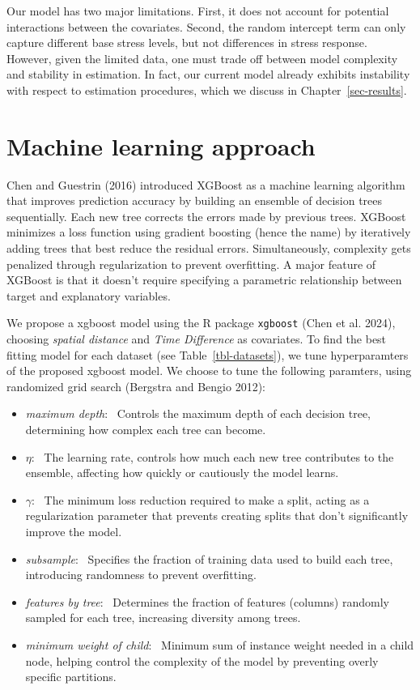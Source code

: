 \documentclass[
  letterpaper,
  DIV=11,
  numbers=noendperiod,
  twocolumn,
  open=any]{scrreprt}
\providecommand{\tightlist}{%
  \setlength{\itemsep}{0pt}\setlength{\parskip}{0pt}}\usepackage{longtable,booktabs,array}
\begin{document}
Our model has two major limitations. First, it does not account for
potential interactions between the covariates. Second, the random
intercept term can only capture different base stress levels, but not
differences in stress response. However, given the limited data, one
must trade off between model complexity and stability in estimation. In
fact, our current model already exhibits instability with respect to
estimation procedures, which we discuss in Chapter~\ref{sec-results}.

\section{Machine learning approach}\label{machine-learning-approach}

Chen and Guestrin (2016) introduced XGBoost as a machine learning
algorithm that improves prediction accuracy by building an ensemble of
decision trees sequentially. Each new tree corrects the errors made by
previous trees. XGBoost minimizes a loss function using gradient
boosting (hence the name) by iteratively adding trees that best reduce
the residual errors. Simultaneously, complexity gets penalized through
regularization to prevent overfitting. A major feature of XGBoost is
that it doesn't require specifying a parametric relationship between
target and explanatory variables.

We propose a xgboost model using the R package \texttt{xgboost} (Chen et
al. 2024), choosing \emph{spatial distance} and \emph{Time Difference}
as covariates. To find the best fitting model for each dataset (see
Table~\ref{tbl-datasets}), we tune hyperparamters of the proposed
xgboost model. We choose to tune the following paramters, using
randomized grid search (Bergstra and Bengio 2012):

\begin{itemize}
\tightlist
\item
  \emph{maximum depth}:~ Controls the maximum depth of each decision
  tree, determining how complex each tree can become.
\item
  \(\eta\):~ The learning rate, controls how much each new tree
  contributes to the ensemble, affecting how quickly or cautiously the
  model learns.
\item
  \(\gamma\):~ The minimum loss reduction required to make a split,
  acting as a regularization parameter that prevents creating splits
  that don't significantly improve the model.
\item
  \emph{subsample}:~ Specifies the fraction of training data used to
  build each tree, introducing randomness to prevent overfitting.
\item
  \emph{features by tree}:~ Determines the fraction of features
  (columns) randomly sampled for each tree, increasing diversity among
  trees.
\item
  \emph{minimum weight of child}:~ Minimum sum of instance weight needed
  in a child node, helping control the complexity of the model by
  preventing overly specific partitions.
\end{itemize}
\end{document}
